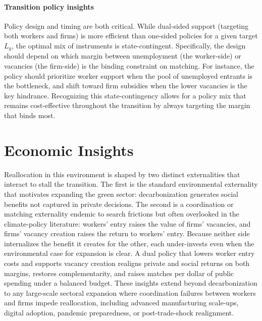 \documentclass[preprint,12pt]{elsarticle}
\begin{document}
\paragraph{Transition policy insights} Policy design and timing are both critical. While dual-sided support (targeting both workers and firms) is more efficient than one-sided policies for a given target $L_g$, the optimal mix of instruments is state-contingent. Specifically, the design should depend on which margin between unemployment (the worker-side) or vacancies (the firm-side) is the binding constraint on matching. For instance, the policy should prioritize worker support when the pool of unemployed entrants is the bottleneck, and shift toward firm subsidies when the lower vacancies is the key hindrance. Recognizing this state-contingency allows for a policy mix that remains cost-effective throughout the transition by always targeting the margin that binds most.

\section{Economic Insights}
Reallocation in this environment is shaped by two distinct externalities that interact to stall the transition. The first is the standard environmental externality that motivates expanding the green sector: decarbonization generates social benefits not captured in private decisions. The second is a coordination or matching externality endemic to search frictions but often overlooked in the climate-policy literature: workers' entry raises the value of firms' vacancies, and firms' vacancy creation raises the return to workers' entry. Because neither side internalizes the benefit it creates for the other, each under-invests even when the environmental case for expansion is clear. A dual policy that lowers worker entry costs and supports vacancy creation realigns private and social returns on both margins, restores complementarity, and raises matches per dollar of public spending under a balanced budget. These insights extend beyond decarbonization to any large-scale sectoral expansion where coordination failures between workers and firms impede reallocation, including advanced manufacturing scale-ups, digital adoption, pandemic preparedness, or post-trade-shock realignment.
\end{document}

